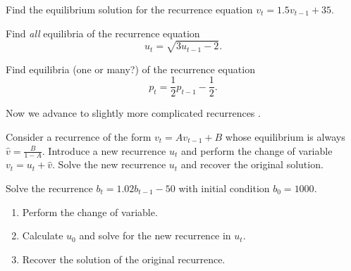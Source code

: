 \documentclass[../main.tex]{subfiles}
\begin{document}
\begin{example} \label{ex:recurrence-equilibrium-find}
  Find the equilibrium solution for the recurrence equation \(v_{t} = 1.5 v_{t-1} + 35\).

  \blanks*
\end{example}
\clearpage

\begin{exercise} \label{ex:recurrence-equilibria-sqrt}
  Find \emph{all} equilibria of the recurrence equation \[u_{t} = \sqrt{3 u_{t-1} - 2}.\]

\end{exercise}

\begin{exercise} \label{ex:recurrence-equilibria-half}
  Find equilibria (one or many?) of the recurrence equation \[p_{t} = \frac{1}{2} p_{t-1} - \frac{1}{2}.\]

  \blanks*
\end{exercise}
\clearpage

Now we advance to slightly more complicated recurrences .

\begin{method} \label{method:recurrence-sub}
  Consider a recurrence of the form \(v_{t} = A v_{t-1} + B\) whose equilibrium is always \(\hat{v} = \frac{B}{1 - A}\). Introduce a new recurrence \(u_{t}\) and perform the change of variable \(v_{t} = u_{t} + \hat{v}\). Solve the new recurrence \(u_{t}\) and recover the original solution.
\end{method}

\begin{example} \label{ex:recurrence-sub-worked}
  Solve the recurrence \(b_{t} = 1.02 b_{t-1} - 50\) with initial condition \(b_{0} = 1000\).

  \begin{enumerate}[wide, label={Step~(\arabic*).}]
    \item Perform the change of variable.


    \item Calculate \(u_{0}\) and solve for the new recurrence in \(u_{t}\). 


    \item Recover the solution of the original recurrence.

      \blanks*
  \end{enumerate}
\end{example}
\clearpage
\end{document}
